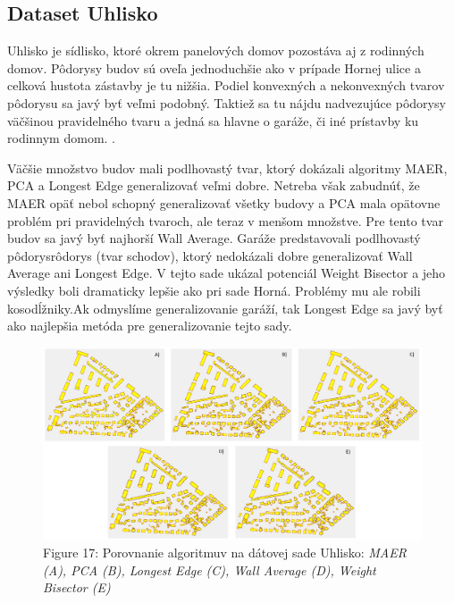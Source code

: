 \documentclass[12pt]{article}
\begin{document}
\subsection*{Dataset Uhlisko}
Uhlisko je sídlisko, ktoré okrem panelových domov pozostáva aj z rodinných domov. Pôdorysy budov sú oveľa jednoduchšie ako v prípade Hornej ulice a celková hustota zástavby je tu nižšia. Podiel konvexných a nekonvexných tvarov pôdorysu sa javý byť veľmi podobný. Taktiež sa tu nájdu nadvezujúce pôdorysy väčšinou pravidelného tvaru a jedná sa hlavne o garáže, či iné prístavby ku rodinnym domom. .
\par
Väčšie množstvo budov mali podlhovastý tvar, ktorý dokázali algoritmy MAER, PCA a Longest Edge generalizovať veľmi dobre. Netreba však zabudnúť, že MAER opäť nebol schopný generalizovať všetky budovy a PCA mala opätovne problém pri pravidelných tvaroch, ale teraz v menšom množstve. Pre tento tvar budov sa javý byť najhorší Wall Average. Garáže predstavovali podlhovastý pôdorysrôdorys (tvar schodov), ktorý nedokázali dobre generalizovať Wall Average ani Longest Edge. V tejto sade ukázal potenciál Weight Bisector a jeho výsledky boli dramaticky lepšie ako pri sade Horná. Problémy mu ale robili kosodĺžniky.Ak odmyslíme generalizovanie garáží, tak Longest Edge sa javý byť ako najlepšia metóda pre generalizovanie tejto sady.
\begin{figure}[h]
    \centering
    \includegraphics[width=1\linewidth]{latex/image/uhlisko.jpg}
    {Figure 17: Porovnanie algoritmuv na dátovej sade Uhlisko:\textit{ MAER (A), PCA (B), Longest Edge (C), Wall Average (D), Weight Bisector (E)} }
    \label{fig:enter-label}
\end{figure}
$$$$
\end{document}
